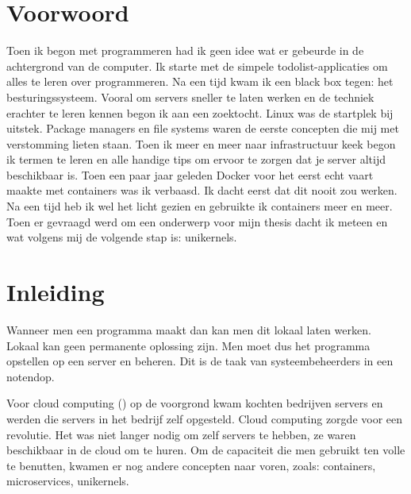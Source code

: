 \documentclass[pdftex,a4paper,12pt,twoside]{report}
\begin{document}
\begin{abstract}
\end{abstract}

\chapter*{Voorwoord}
\label{ch:voorwoord}

Toen ik begon met programmeren had ik geen idee wat er gebeurde in de achtergrond van de computer. Ik starte met de simpele todolist-applicaties om alles te leren over programmeren. Na een tijd kwam ik een black box tegen: het besturingssysteem. Vooral om servers sneller te laten werken en de techniek erachter te leren kennen begon ik aan een zoektocht. Linux was de startplek bij uitstek. Package managers en file systems waren de eerste concepten die mij met verstomming lieten staan. Toen ik meer en meer naar infrastructuur keek begon ik termen te leren en alle handige tips om ervoor te zorgen dat je server altijd beschikbaar is. Toen een paar jaar geleden Docker voor het eerst echt vaart maakte met containers was ik verbaasd. Ik dacht eerst dat dit nooit zou werken. Na een tijd heb ik wel het licht gezien en gebruikte ik containers meer en meer. Toen er gevraagd werd om een onderwerp voor mijn thesis dacht ik meteen en wat volgens mij de volgende stap is: unikernels.

\tableofcontents



\chapter{Inleiding}
\label{ch:inleiding}

Wanneer men een programma maakt dan kan men dit lokaal laten werken. Lokaal kan geen permanente oplossing zijn. Men moet dus het programma opstellen op een server en beheren. Dit is de taak van systeembeheerders in een notendop. 

Voor cloud computing (\cite{Mirashe2010}) op de voorgrond kwam kochten bedrijven servers en werden die servers in het bedrijf zelf opgesteld. Cloud computing zorgde voor een revolutie. Het was niet langer nodig om zelf servers te hebben, ze waren beschikbaar in de cloud om te huren. Om de capaciteit die men gebruikt ten volle te benutten, kwamen er nog andere concepten naar voren, zoals: containers, microservices, unikernels.
\end{document}
